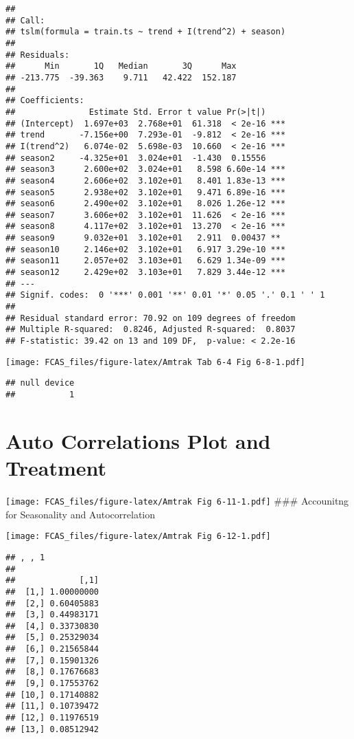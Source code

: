 \documentclass[]{article}
\begin{document}
\begin{verbatim}
## 
## Call:
## tslm(formula = train.ts ~ trend + I(trend^2) + season)
## 
## Residuals:
##      Min       1Q   Median       3Q      Max 
## -213.775  -39.363    9.711   42.422  152.187 
## 
## Coefficients:
##               Estimate Std. Error t value Pr(>|t|)    
## (Intercept)  1.697e+03  2.768e+01  61.318  < 2e-16 ***
## trend       -7.156e+00  7.293e-01  -9.812  < 2e-16 ***
## I(trend^2)   6.074e-02  5.698e-03  10.660  < 2e-16 ***
## season2     -4.325e+01  3.024e+01  -1.430  0.15556    
## season3      2.600e+02  3.024e+01   8.598 6.60e-14 ***
## season4      2.606e+02  3.102e+01   8.401 1.83e-13 ***
## season5      2.938e+02  3.102e+01   9.471 6.89e-16 ***
## season6      2.490e+02  3.102e+01   8.026 1.26e-12 ***
## season7      3.606e+02  3.102e+01  11.626  < 2e-16 ***
## season8      4.117e+02  3.102e+01  13.270  < 2e-16 ***
## season9      9.032e+01  3.102e+01   2.911  0.00437 ** 
## season10     2.146e+02  3.102e+01   6.917 3.29e-10 ***
## season11     2.057e+02  3.103e+01   6.629 1.34e-09 ***
## season12     2.429e+02  3.103e+01   7.829 3.44e-12 ***
## ---
## Signif. codes:  0 '***' 0.001 '**' 0.01 '*' 0.05 '.' 0.1 ' ' 1
## 
## Residual standard error: 70.92 on 109 degrees of freedom
## Multiple R-squared:  0.8246, Adjusted R-squared:  0.8037 
## F-statistic: 39.42 on 13 and 109 DF,  p-value: < 2.2e-16
\end{verbatim}

\texttt{[image: FCAS\_files/figure-latex/Amtrak Tab 6-4 Fig 6-8-1.pdf]}

\begin{verbatim}
## null device 
##           1
\end{verbatim}

\section{Auto Correlations Plot and
Treatment}\label{auto-correlations-plot-and-treatment}

\texttt{[image: FCAS\_files/figure-latex/Amtrak Fig 6-11-1.pdf]} \#\#\#
Accounitng for Seasonality and Autocorrelation

\texttt{[image: FCAS\_files/figure-latex/Amtrak Fig 6-12-1.pdf]}

\begin{verbatim}
## , , 1
## 
##             [,1]
##  [1,] 1.00000000
##  [2,] 0.60405883
##  [3,] 0.44983171
##  [4,] 0.33730830
##  [5,] 0.25329034
##  [6,] 0.21565844
##  [7,] 0.15901326
##  [8,] 0.17676683
##  [9,] 0.17553762
## [10,] 0.17140882
## [11,] 0.10739472
## [12,] 0.11976519
## [13,] 0.08512942
\end{verbatim}
\end{document}
